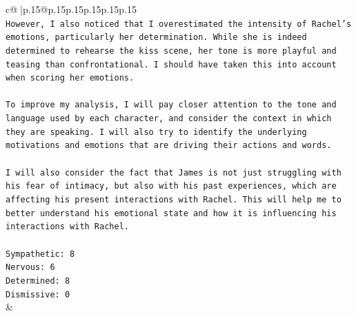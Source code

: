\documentclass{article}
\begin{document}
{\begin{supertabular}{c@{$\;$}|p{.15\linewidth}@{}p{.15\linewidth}p{.15\linewidth}p{.15\linewidth}p{.15\linewidth}p{.15\linewidth}}
{{{\\ 
\texttt{However, I also noticed that I overestimated the intensity of Rachel's emotions, particularly her determination. While she is indeed determined to rehearse the kiss scene, her tone is more playful and teasing than confrontational. I should have taken this into account when scoring her emotions.} \\
\\ 
\texttt{To improve my analysis, I will pay closer attention to the tone and language used by each character, and consider the context in which they are speaking. I will also try to identify the underlying motivations and emotions that are driving their actions and words.} \\
\\ 
\texttt{I will also consider the fact that James is not just struggling with his fear of intimacy, but also with his past experiences, which are affecting his present interactions with Rachel. This will help me to better understand his emotional state and how it is influencing his interactions with Rachel.} \\
\\ 
\texttt{Sympathetic: 8} \\
\texttt{Nervous: 6} \\
\texttt{Determined: 8} \\
\texttt{Dismissive: 0} \\
            }
        }
    }
    & \\ \\

\end{supertabular}
}
\end{document}
